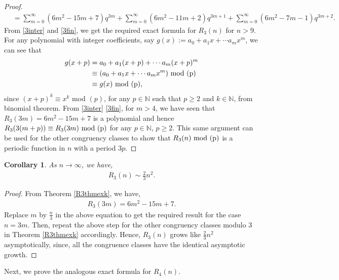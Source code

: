 \documentclass[12pt,reqno]{amsart}
\numberwithin{equation}{section}
\theoremstyle{plain}
\newtheorem{corollary}[theorem]{Corollary}
\begin{document}
\begin{proof}
\begin{align}
			&= \sum_{m=0}^{\infty} \left( 6m^2 -15m + 7 \right) q^{3m} +\sum_{m=0}^{\infty} \left( 6m^2 -11m + 2 \right) q^{3m+1} + \sum_{m=0}^{\infty} \left( 6m^2 -7m - 1 \right) q^{3m+2}. \label{3fin}
		\end{align}
		From \eqref{3inter} and \eqref{3fin}, we get the required exact formula for $R_3(n)$ for $n>9$. For any polynomial with integer coefficients, say $g(x):=a_0 + a_1 x + \cdots a_m x^m$, we can see that
		\begin{align*}
			g(x+p) &= a_0 + a_1 (x+p) + \cdots a_m (x+p)^m\\
			&\equiv (a_0 + a_1 x + \cdots a_m x^m) \textup{ mod (p)}\\
			&\equiv g(x) \textup{ mod (p)},
		\end{align*}
		since $(x+p)^k \equiv x^k$ mod $(p)$, for any $p \in \mathbb{N}$ such that $p\geq2$ and $k \in \mathbb{N}$, from binomial theorem. From \eqref{3inter} \eqref{3fin}, for $m>4$, we have seen that $R_3(3m) = 6m^2 -15m+7$ is a polynomial and hence $R_3(3(m+p)) \equiv R_3(3m) \textup{ mod (p)}$ for any $p \in \mathbb{N}$, $ p\geq2$. This same argument can be used for the other congruency classes to show that $R_3(n) \textup{ mod (p)}$ is a periodic function in $n$ with a period $3p$.
	\end{proof}
	\begin{corollary}\label{CorR3G}
		As $n \to \infty$, we have,
		\begin{align*}
			R_3(n) \sim \frac{2}{3}n^2.
		\end{align*}
	\end{corollary}
	\begin{proof}
		From Theorem \ref{R3thmexk}, we have,
		\begin{align*}
			R_3(3m) = 6m^2 - 15m +7.
		\end{align*}
	Replace $m$ by $\frac{n}{3}$ in the above equation to get the required result for the case $n=3m$. Then, repeat the above step for the other congruency classes modulo $3$ in Theorem \ref{R3thmexk} accordingly. Hence, $R_3(n)$ grows like $\frac{2}{3}n^2$ asymptotically, since, all the congruence classes have the identical asymptotic growth. 
	\end{proof}
	Next, we prove the analogous exact formula for $R_4(n)$.
\end{document}
